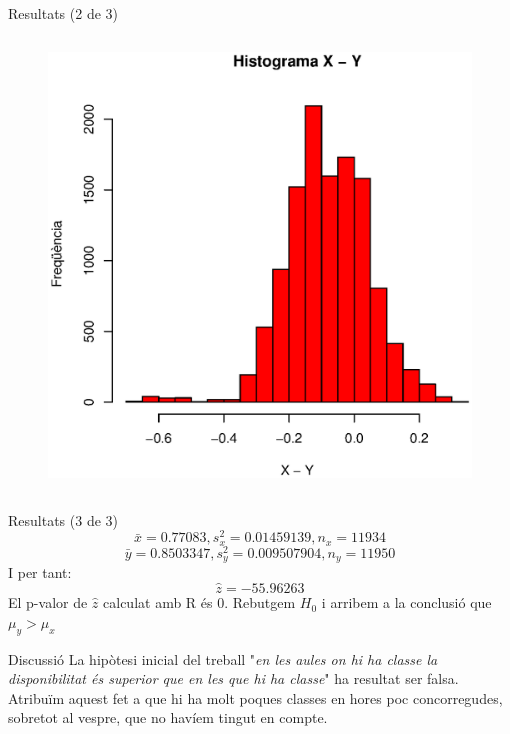 \documentclass[xetex,mathserif,serif]{beamer}
\begin{document}
\begin{frame}{Resultats (2 de 3)}
\begin{columns}[T]
\begin{column}{0.4\linewidth}
\begin{figure}
      \includegraphics[width=1\linewidth]{images/histograma}
      \end{figure}
    \end{column}
    \end{columns}
  \end{frame}
  
  \begin{frame}{Resultats (3 de 3)}
    $$\bar{x} = 0.77083, s^2_x = 0.01459139, n_x = 11934$$
    $$\bar{y} = 0.8503347, s^2_y = 0.009507904, n_y = 11950$$
    I per tant:
    $$\hat{z} = -55.96263$$
    El p-valor de $\hat{z}$ calculat amb R és 0. Rebutgem $H_0$ i arribem a la conclusió que $\mu_y > \mu_x$
  \end{frame}
  
  \begin{frame}{Discussió}
    La hipòtesi inicial del treball "\emph{en les aules on hi ha classe la disponibilitat és superior que en les que hi ha classe}" ha resultat ser falsa. \\
    Atribuïm aquest fet a que hi ha molt poques classes en hores poc concorregudes, sobretot al vespre, que no havíem tingut en compte.
  \end{frame}
\end{document}
